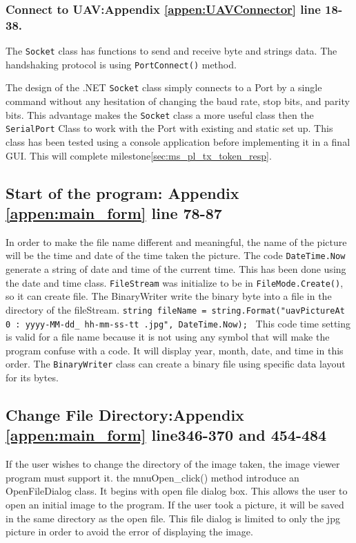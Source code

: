 \subsubsection*{Connect to UAV:Appendix \ref{appen:UAVConnector} line 18-38.}
The \texttt{Socket} class has functions to send and receive byte and strings data. The handshaking protocol is using \texttt{PortConnect()} method.  
        
The design of the .NET \texttt{Socket} class simply connects to a Port by a single command without any hesitation of changing the baud rate, stop bits, and parity bits. 
This advantage makes the \texttt{Socket} class a more useful class then the \texttt{SerialPort} Class to work with the Port with existing and static set up. 
This class has been tested using a console application before implementing it in a final GUI. 
This will complete milestone\ref{sec:ms_pl_tx_token_resp}.

\subsection{Start of the program: Appendix \ref{appen:main_form} line 78-87}%
In order to make the file name different and meaningful, the name of the picture will be the time and date of the time taken the picture. The code \texttt{DateTime.Now} generate a string of date and time of the current time. This has been done using the date and time class. \texttt{FileStream} was initialize to be in \texttt{FileMode.Create()}, so it can create file. The BinaryWriter write the binary byte into a file in the directory of the fileStream. \texttt{string fileName = string.Format("uavPictureAt{ 0 : yyyy-MM-dd\_ hh-mm-ss-tt}
 .jpg", DateTime.Now);   }  
This code time setting is valid for a file name because it is not using any symbol that will make the program confuse with a code. 
It will display year, month, date, and time in this order. 
The \texttt{BinaryWriter} class can create a binary file using specific data layout for its bytes. 

\subsection{Change File Directory:Appendix \ref{appen:main_form} line346-370 and 454-484 }%
If the user wishes to change the directory of the image taken, the image viewer program must support it. the mnuOpen\_click() method introduce an OpenFileDialog class. It begins with open file dialog box. This allows the user to open an initial image to the program. If the user took a picture, it will be saved in the same directory as the open file. This file dialog is limited to only the jpg picture in order to avoid the error of displaying the image. 
        
